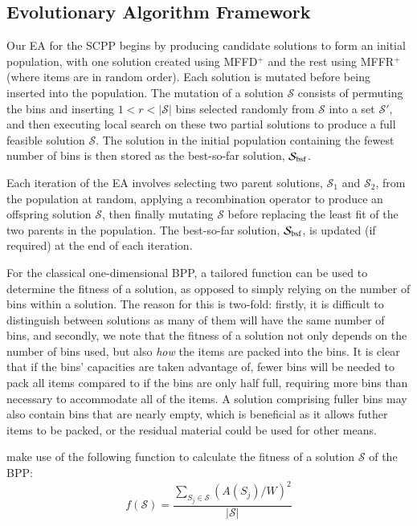 \documentclass[authoryear]{elsarticle}
\begin{document}
\subsection{Evolutionary Algorithm Framework}
\label{sub:eaframework}
\noindent Our EA for the SCPP begins by producing candidate solutions to form an initial population, with one solution created using MFFD$^+$ and the rest using MFFR$^+$ (where items are in random order). Each solution is mutated before being inserted into the population. The mutation of a solution $\mathcal{S}$ consists of permuting the bins and inserting $1 < r < |\mathcal{S}|$ bins selected randomly from $\mathcal{S}$ into a set $\mathcal{S}'$, and then executing local search on these two partial solutions to produce a full feasible solution $\mathcal{S}$. The solution in the initial population containing the fewest number of bins is then stored as the best-so-far solution, $\mathcal{S}_{\textup{bsf}}$.

Each iteration of the EA involves selecting two parent solutions, $\mathcal{S}_1$ and $\mathcal{S}_2$, from the population at random, applying a recombination operator to produce an offspring solution $\mathcal{S}$, then finally mutating $\mathcal{S}$ before replacing the least fit of the two parents in the population. The best-so-far solution, $\mathcal{S}_{\textup{bsf}}$, is updated (if required) at the end of each iteration.

For the classical one-dimensional BPP, a tailored function can be used to determine the fitness of a solution, as opposed to simply relying on the number of bins within a solution. The reason for this is two-fold: firstly, it is difficult to distinguish between solutions as many of them will have the same number of bins, and secondly, we note that the fitness of a solution not only depends on the number of bins used, but also \emph{how} the items are packed into the bins. It is clear that if the bins' capacities are taken advantage of, fewer bins will be needed to pack all items compared to if the bins are only half full, requiring more bins than necessary to accommodate all of the items. A solution comprising fuller bins may also contain bins that are nearly empty, which is beneficial as it allows futher items to be packed, or the residual material could be used for other means.

\citet{falkenauer1992} make use of the following function to calculate the fitness of a solution $\mathcal{S}$ of the BPP:
\begin{equation}
f(\mathcal{S}) = \frac{\sum_{S_j \in \mathcal{S}} (A(S_j)/W)^2}{|\mathcal{S}|}
\label{eqn:fitness}
\end{equation}
\end{document}
